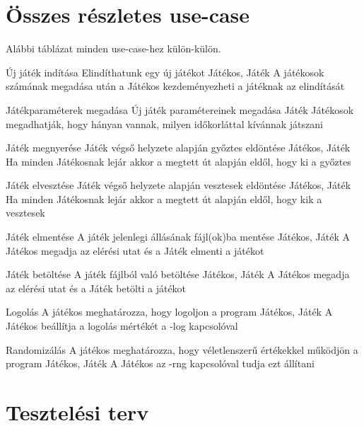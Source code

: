 \section{Összes részletes use-case}
Alábbi táblázat minden use-case-hez külön-külön.

\usecase%
{Új játék indítása}%
{Elindíthatunk egy új játékot}%
{Játékos, Játék}%
{A játékosok számának megadása után a Játékos kezdeményezheti a játéknak az elindítását}

\usecase%
{Játékparaméterek megadása}%
{Új játék paramétereinek megadása}%
{Játék}%
{Játékosok megadhatják, hogy hányan vannak, milyen időkorláttal kívánnak játszani}

\usecase%
{Játék megnyerése}%
{Játék végső helyzete alapján győztes eldöntése}%
{Játékos, Játék}%
{Ha minden Játékosnak lejár akkor a megtett út alapján eldől, hogy ki a győztes}

\usecase%
{Játék elvesztése}%
{Játék végső helyzete alapján vesztesek eldöntése}%
{Játékos, Játék}%
{Ha minden Játékosnak lejár akkor a megtett út alapján eldől, hogy kik a vesztesek}

\usecase%
{Játék elmentése}
{A játék jelenlegi állásának fájl(ok)ba mentése}
{Játékos, Játék}
{A Játékos megadja az elérési utat és a Játék elmenti a játékot}

\usecase%
{Játék betöltése}
{A játék fájlból való betöltése}
{Játékos, Játék}
{A Játékos megadja az elérési utat és a Játék betölti a játékot}

\usecase%
{Logolás}
{A játékos meghatározza, hogy logoljon a program}
{Játékos, Játék}
{A Játékos beállítja a logolás mértékét a -log kapcsolóval}

\usecase%
{Randomizálás}
{A játékos meghatározza, hogy véletlenszerű értékekkel működjön a program}
{Játékos, Játék}
{A Játékos az -rng kapcsolóval tudja ezt állítani}


\section{Tesztelési terv}

